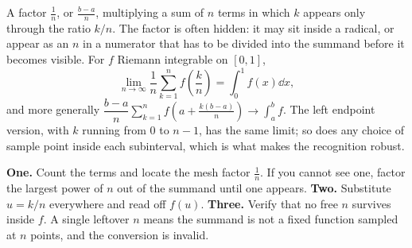\begin{center}
\end{center}

\cue A factor $\tfrac1n$, or $\tfrac{b-a}{n}$, multiplying a sum of $n$ terms in which $k$ appears only through the ratio $k/n$. The factor is often hidden: it may sit inside a radical, or appear as an $n$ in a numerator that has to be divided into the summand before it becomes visible.
\method For $f$ Riemann integrable on $[0,1]$,
\[\lim_{n\to\infty}\frac1n\sum_{k=1}^{n}f\!\left(\frac{k}{n}\right)=\int_{0}^{1}f(x)\dd x,\]
and more generally $\dfrac{b-a}{n}\displaystyle\sum_{k=1}^{n}f\!\left(a+\frac{k(b-a)}{n}\right)\to\int_{a}^{b}f$. The left endpoint version, with $k$ running from $0$ to $n-1$, has the same limit; so does any choice of sample point inside each subinterval, which is what makes the recognition robust.

\begin{keynote}
\textbf{One.} Count the terms and locate the mesh factor $\tfrac1n$. If you cannot see one, factor the largest power of $n$ out of the summand until one appears. \textbf{Two.} Substitute $u=k/n$ everywhere and read off $f(u)$. \textbf{Three.} Verify that no free $n$ survives inside $f$. A single leftover $n$ means the summand is not a fixed function sampled at $n$ points, and the conversion is invalid.
\end{keynote}


